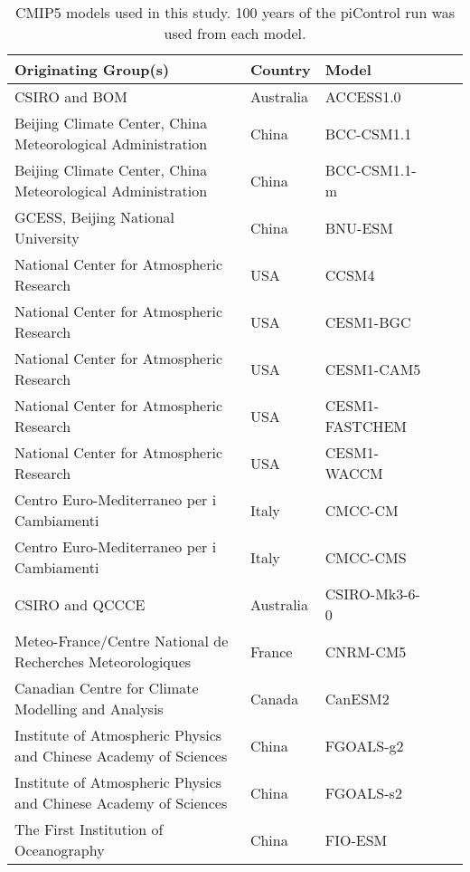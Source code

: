 \begin{center}
	\begin{table}[ht]
	\caption{CMIP5 models used in this study. 100 years of the piControl run was 
	used from each model.}
		\label{tab:cmip5}
		\tiny
	\begin{tabular}{ l  l  l  l l}
		Originating Group(s) & Country & Model \\ \hline
		CSIRO and BOM & Australia & ACCESS1.0 \\
Beijing Climate Center, China Meteorological Administration & China & BCC-CSM1.1 
		 \\
Beijing Climate Center, China Meteorological Administration & China & 
		BCC-CSM1.1-m \\
		GCESS, Beijing National University & China & BNU-ESM \\
National Center for Atmospheric Research & USA & CCSM4 \\
		National Center for Atmospheric Research  & USA & CESM1-BGC  \\
		National Center for Atmospheric Research  & USA & CESM1-CAM5  \\
		National Center for Atmospheric Research  & USA & CESM1-FASTCHEM \\
		National Center for Atmospheric Research  & USA & CESM1-WACCM  \\
		Centro Euro-Mediterraneo per i Cambiamenti & Italy & CMCC-CM \\
		Centro Euro-Mediterraneo per i Cambiamenti & Italy & CMCC-CMS \\
		CSIRO and QCCCE & Australia & CSIRO-Mk3-6-0 \\
Meteo-France/Centre National de Recherches Meteorologiques & France & CNRM-CM5 
		\\
Canadian Centre for Climate Modelling and Analysis & Canada & CanESM2 \\
		Institute of Atmospheric Physics and Chinese Academy of Sciences & China & 
		FGOALS-g2 \\
		Institute of Atmospheric Physics and Chinese Academy of Sciences & China & 
		FGOALS-s2 \\
		The First Institution of Oceanography & China & FIO-ESM \\


\end{tabular}
\end{table}
\end{center}

